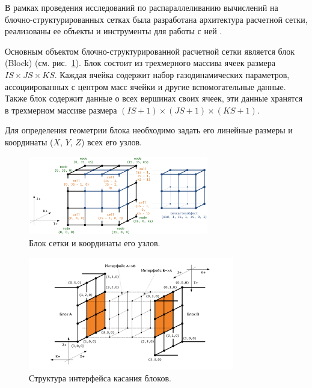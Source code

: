 В рамках проведения исследований по распараллеливанию вычислений на блочно-структурированных сетках была разработана архитектура расчетной сетки, реализованы ее объекты и инструменты для работы с ней \cite{CertRybakov2020PrepStruct}.

Основным объектом блочно-структурированной расчетной сетки является блок (Block) (см. рис.~\ref{fig:text_2_block_block_and_coords}). 
Блок состоит из трехмерного массива ячеек размера $IS \times JS \times KS$.
Каждая ячейка содержит набор газодинамических параметров, ассоциированных с центром масс ячейки и другие вспомогательные данные.
Также блок содержит данные о всех вершинах своих ячеек, эти данные хранятся в трехмерном массиве размера $(IS + 1) \times (JS + 1) \times (KS + 1)$.

Для определения геометрии блока необходимо задать его линейные размеры и координаты ($X$, $Y$, $Z$) всех его узлов.

\begin{figure}[ht]
\centering
\includegraphics[width=0.7\textwidth]{./pics/text_2_block/6-block-and-coords.png}
\singlespacing
{}\caption{Блок сетки и координаты его узлов.}
\label{fig:text_2_block_block_and_coords}
\end{figure}

\begin{figure}[ht]
\centering
\includegraphics[width=0.8\textwidth]{./pics/text_2_block/7-iface.pdf}
\singlespacing
{}\caption{Структура интерфейса касания блоков.}
\label{fig:text_2_block_iface}
\end{figure}

